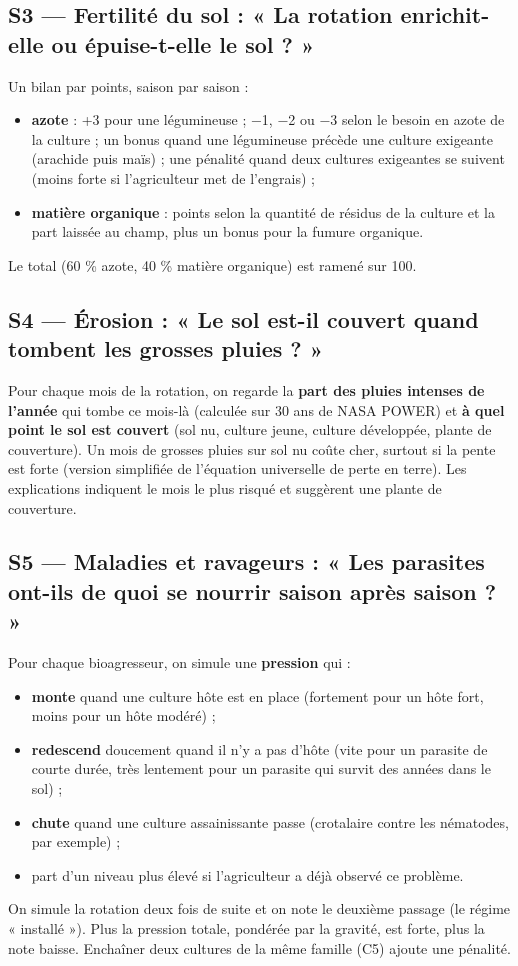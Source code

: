 \documentclass[11pt,a4paper]{article}
\begin{document}
\subsection*{S3 — Fertilité du sol : « La rotation enrichit-elle ou épuise-t-elle le sol ? »}
Un bilan par points, saison par saison :
\begin{itemize}
\item \textbf{azote} : +3 pour une légumineuse ; −1, −2 ou −3 selon le besoin en azote de la culture ; un bonus
quand une légumineuse précède une culture exigeante (arachide puis maïs) ; une pénalité quand deux cultures
exigeantes se suivent (moins forte si l'agriculteur met de l'engrais) ;
\item \textbf{matière organique} : points selon la quantité de résidus de la culture et la part laissée au champ, plus un bonus pour la fumure organique.
\end{itemize}
Le total (60 \% azote, 40 \% matière organique) est ramené sur 100.

\subsection*{S4 — Érosion : « Le sol est-il couvert quand tombent les grosses pluies ? »}
Pour chaque mois de la rotation, on regarde la \textbf{part des pluies intenses de l'année} qui tombe ce mois-là
(calculée sur 30 ans de NASA POWER) et \textbf{à quel point le sol est couvert} (sol nu, culture jeune, culture
développée, plante de couverture). Un mois de grosses pluies sur sol nu coûte cher, surtout si la pente est forte
(version simplifiée de l'équation universelle de perte en terre). Les explications indiquent le mois le plus risqué
et suggèrent une plante de couverture.

\subsection*{S5 — Maladies et ravageurs : « Les parasites ont-ils de quoi se nourrir saison après saison ? »}
Pour chaque bioagresseur, on simule une \textbf{pression} qui :
\begin{itemize}
\item \textbf{monte} quand une culture hôte est en place (fortement pour un hôte fort, moins pour un hôte modéré) ;
\item \textbf{redescend} doucement quand il n'y a pas d'hôte (vite pour un parasite de courte durée, très lentement pour un parasite qui survit des années dans le sol) ;
\item \textbf{chute} quand une culture assainissante passe (crotalaire contre les nématodes, par exemple) ;
\item part d'un niveau plus élevé si l'agriculteur a déjà observé ce problème.
\end{itemize}
On simule la rotation deux fois de suite et on note le deuxième passage (le régime « installé »). Plus la pression
totale, pondérée par la gravité, est forte, plus la note baisse. Enchaîner deux cultures de la même famille (C5)
ajoute une pénalité.
\end{document}
